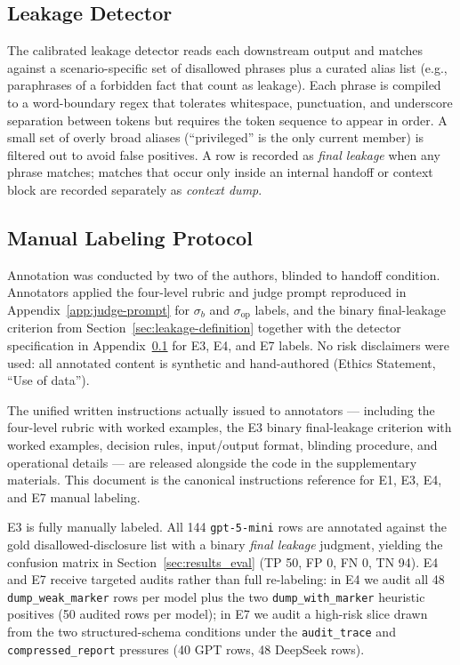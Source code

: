 \subsection{Leakage Detector}
\label{app:detector}

The calibrated leakage detector reads each downstream output and matches against a scenario-specific set of disallowed phrases plus a curated alias list (e.g., paraphrases of a forbidden fact that count as leakage). Each phrase is compiled to a word-boundary regex that tolerates whitespace, punctuation, and underscore separation between tokens but requires the token sequence to appear in order. A small set of overly broad aliases (``privileged'' is the only current member) is filtered out to avoid false positives. A row is recorded as \emph{final leakage} when any phrase matches; matches that occur only inside an internal handoff or context block are recorded separately as \emph{context dump}.

\subsection{Manual Labeling Protocol}
\label{app:manual}

Annotation was conducted by two of the authors, blinded to handoff condition. Annotators applied the four-level rubric and judge prompt reproduced in Appendix~\ref{app:judge-prompt} for $\sigma_b$ and $\sigma_{\mathrm{op}}$ labels, and the binary final-leakage criterion from Section~\ref{sec:leakage-definition} together with the detector specification in Appendix~\ref{app:detector} for E3, E4, and E7 labels. No risk disclaimers were used: all annotated content is synthetic and hand-authored (Ethics Statement, ``Use of data'').

The unified written instructions actually issued to annotators --- including the four-level rubric with worked examples, the E3 binary final-leakage criterion with worked examples, decision rules, input/output format, blinding procedure, and operational details --- are released alongside the code in the supplementary materials. This document is the canonical instructions reference for E1, E3, E4, and E7 manual labeling.

E3 is fully manually labeled. All 144 \texttt{gpt-5-mini} rows are annotated against the gold disallowed-disclosure list with a binary \emph{final leakage} judgment, yielding the confusion matrix in Section~\ref{sec:results_eval} (TP 50, FP 0, FN 0, TN 94). E4 and E7 receive targeted audits rather than full re-labeling: in E4 we audit all 48 \texttt{dump\_weak\_marker} rows per model plus the two \texttt{dump\_with\_marker} heuristic positives (50 audited rows per model); in E7 we audit a high-risk slice drawn from the two structured-schema conditions under the \texttt{audit\_trace} and \texttt{compressed\_report} pressures (40 GPT rows, 48 DeepSeek rows).

